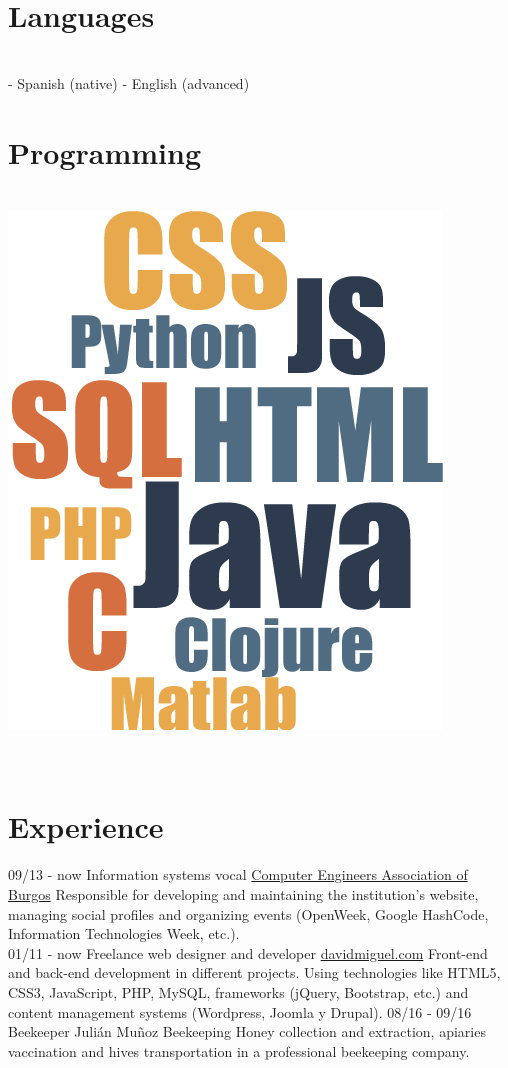 \documentclass[]{friggeri-cv}
\begin{document}
\begin{aside}
  \section{Languages}
    \\[0.3cm]
    - Spanish (native)
    - English (advanced)
    ~       
  \section{Programming}
    \\[0.3cm]
    \includegraphics[scale=0.9]{img/cloud.png}
    ~    
\end{aside}
~
\\ [0.8cm]
\section{Experience}
\begin{entrylist}
    \entry
    {09/13 - now}
    {Information systems vocal}
    {\href{http://abi2burgos.es/}{Computer Engineers Association of Burgos}}
    {Responsible for developing and maintaining the institution's website, managing social profiles and organizing events (OpenWeek, Google HashCode, Information Technologies Week, etc.).\\}
    \entry
    {01/11 - now}
    {Freelance web designer and developer}
    {\href{http://davidmiguel.com/}{davidmiguel.com}}
    {Front-end and back-end development in different projects. Using technologies like HTML5, CSS3, JavaScript, PHP, MySQL, frameworks (jQuery, Bootstrap, etc.) and content management systems (Wordpress, Joomla y Drupal).
    }
    \entry
    {08/16 - 09/16}
    {Beekeeper}
    {Julián Muñoz Beekeeping}
    {Honey collection and extraction, apiaries vaccination and hives transportation in a professional beekeeping company.\\}
\end{entrylist}
\end{document}
